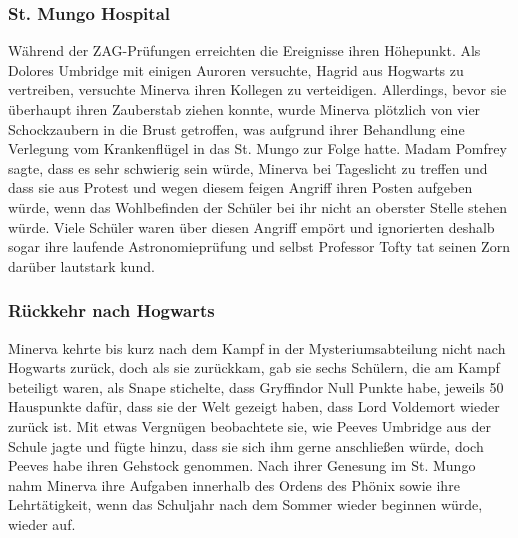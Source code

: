 \documentclass[a4paper, 10pt]{article}
\begin{document}
\subsubsection*{\large St. Mungo Hospital}
Während der ZAG-Prüfungen erreichten die Ereignisse ihren Höhepunkt. Als Dolores Umbridge mit einigen Auroren versuchte, Hagrid aus Hogwarts zu vertreiben, versuchte Minerva ihren Kollegen zu verteidigen. Allerdings, bevor sie überhaupt ihren Zauberstab ziehen konnte, wurde Minerva plötzlich von vier Schockzaubern in die Brust getroffen, was aufgrund ihrer Behandlung eine Verlegung vom Krankenflügel in das St. Mungo zur Folge hatte. Madam Pomfrey sagte, dass es sehr schwierig sein würde, Minerva bei Tageslicht zu treffen und dass sie aus Protest und wegen diesem feigen Angriff ihren Posten aufgeben würde, wenn das Wohlbefinden der Schüler bei ihr nicht an oberster Stelle stehen würde. Viele Schüler waren über diesen Angriff empört und ignorierten deshalb sogar ihre laufende Astronomieprüfung und selbst Professor Tofty tat seinen Zorn darüber lautstark kund.
\subsubsection*{\large Rückkehr nach Hogwarts}
Minerva kehrte bis kurz nach dem Kampf in der Mysteriumsabteilung nicht nach Hogwarts zurück, doch als sie zurückkam, gab sie sechs Schülern, die am Kampf beteiligt waren, als Snape stichelte, dass Gryffindor Null Punkte habe, jeweils 50 Hauspunkte dafür, dass sie der Welt gezeigt haben, dass Lord Voldemort wieder zurück ist. Mit  etwas Vergnügen beobachtete sie, wie Peeves Umbridge aus der Schule jagte und fügte hinzu, dass sie sich ihm gerne anschließen würde, doch Peeves habe ihren Gehstock genommen. Nach ihrer Genesung im St. Mungo nahm Minerva ihre Aufgaben innerhalb des Ordens des Phönix sowie ihre Lehrtätigkeit, wenn das Schuljahr nach dem Sommer wieder beginnen würde, wieder auf.
\end{document}
